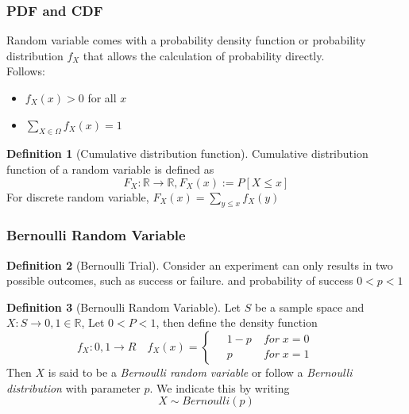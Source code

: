 \documentclass{article}
\theoremstyle{definition}
\newtheorem{definition}{Definition}[subsection]
\begin{document}
\subsubsection{PDF and CDF}
Random variable comes with a probability density function or probability distribution $f_X$ that allows the calculation of probability directly.\\
Follows:
\begin{itemize}
    \item $f_X(x)> 0$ for all $x$
    \item $\sum_{X\in \Omega} f_X(x)=1$ 
\end{itemize}
\begin{definition}[Cumulative distribution function]
    Cumulative distribution function of a random variable is defined as 
    \begin{equation}
        F_X:\mathbb{R}\rightarrow \mathbb{R}, F_X(x):=P[X\leq x]
    \end{equation}
    For discrete random variable, $F_X(x) = \sum_{y\leq x} f_X(y) $
\end{definition}
\subsubsection{Bernoulli Random Variable}
\begin{definition}[Bernoulli Trial]    
Consider an experiment can only results in two possible outcomes, such as success or failure.
and probability of success $0<p<1$
\end{definition}
\begin{definition}[Bernoulli Random Variable]
    Let $S$ be a sample space and $X:S\rightarrow {0,1}\in \mathbb{R}$, Let $0<P<1$, then define the density function
    \begin{equation}
        f_X:{0,1}\rightarrow R \quad f_X(x)=\left \{
            \begin{aligned}
                &\;1-p\; &for\; x=0\qquad \\
                &\;p  & for\;x=1\qquad
            \end{aligned}
            \right.
    \end{equation}
    Then $X$ is said to be a \emph{Bernoulli random variable} or follow a \emph{Bernoulli distribution} with parameter $p$.
    We indicate this by writing
    \begin{equation}
        X \sim Bernoulli(p)
    \end{equation}
\end{definition}
\end{document}

